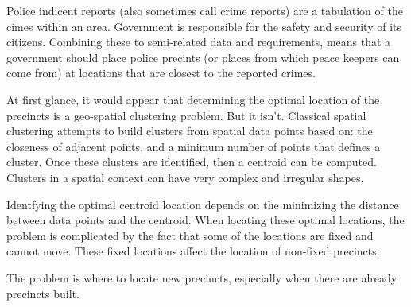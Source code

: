 Police indicent reports (also sometimes call crime reports) are a tabulation of the cimes within an area.  Government is responsible for the safety and security of its citizens.  Combining these to semi-related data and requirements, means that a government should  place police precints (or places from which peace keepers can come from) at locations that are closest to the reported crimes.

At first glance, it would appear that determining the optimal location of the precincts is a geo-spatial clustering problem.  But it isn't.  Classical spatial clustering attempts to build clusters from spatial data points based on: the closeness of adjacent points, and a minimum number of points that defines a cluster.  Once these clusters are identified, then a centroid can be computed.  Clusters in a spatial context can have very complex and irregular shapes.

Identfying the optimal centroid location depends on the minimizing the distance between data points and the centroid.  When locating these optimal locations, the problem is complicated by the fact that some of the locations are fixed and cannot move.  These fixed locations affect the location of non-fixed precincts.

The problem is where to locate new precincts, especially when there are already precincts built.

